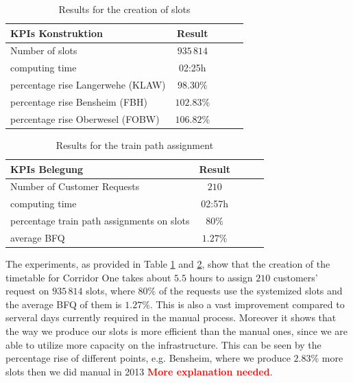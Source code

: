 \begin{table}[h]
	\centering
	\caption{Results for the creation of slots}
	\label{tab:result_Netzfpl}
	\begin{tabular}{lcccc} \hline
		\textbf{KPIs Konstruktion}   & \textbf{Result}  \\ \hline
		Number of slots             & $935\,814$                      \\
		computing time       & 02:25h                     \\
		percentage rise Langerwehe (KLAW)   & $98.30\%$                       \\
		percentage rise Bensheim (FBH) & $102.83\%$                       \\
		percentage rise Oberwesel (FOBW) & $106.82\%$                     \\ \hline
	\end{tabular}
\end{table}
\par

\begin{table}[h]
	\centering
	\caption{Results for the train path assignment}
	\label{tab:result_Netzfpl_Bel}
	\begin{tabular}{lcccc} \hline
		\textbf{KPIs Belegung}   & \textbf{Result}  \\ \hline
		Number of Customer Requests             & $210$                      \\
		computing time       & 02:57h                     \\
		percentage train path assignments on slots   & $80\%$                       \\
		average BFQ & $1.27\%$                             \\ \hline
	\end{tabular}
\end{table}
\par

The experiments, as provided in Table \ref{tab:result_Netzfpl} and \ref{tab:result_Netzfpl_Bel}, show that the creation of the timetable for Corridor One takes about $5.5$ hours to assign $210$ customers' request on $935\,814$ slots, where $80\%$ of the requests use the systemized slots and the average BFQ of them is $1.27\%$. This is also a vast improvement compared to serveral days currently required in the manual process. Moreover it shows that the way we produce our slots is more efficient than the manual ones, since we are able to utilize more capacity on the infrastructure. This can be seen by the percentage rise of different points, e.g. Bensheim, where we produce $2.83\%$ more slots then we did manual in 2013 \textbf{\textcolor{red}{More explanation needed}}.